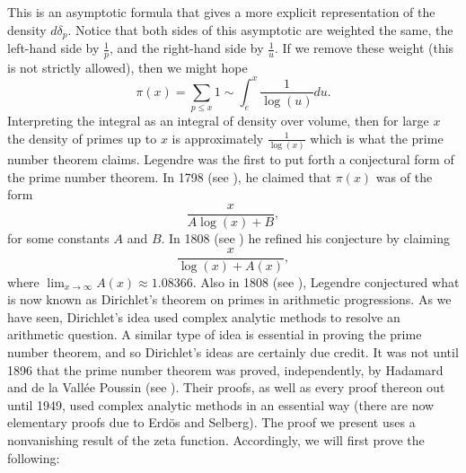 \documentclass[12pt]{book}
\theoremstyle{definition}\newframedtheorem{method}{Method}
\renewcommand{\d}{\delta}
\newcommand{\<}{\langle}
\renewcommand{\>}{\rangle}
\begin{document}
      This is an asymptotic formula that gives a more explicit representation of the density $d\d_{p}$. Notice that both sides of this asymptotic are weighted the same, the left-hand side by $\frac{1}{p}$, and the right-hand side by $\frac{1}{u}$. If we remove these weight (this is not strictly allowed), then we might hope
      \[
        \pi(x) = \sum_{p \le x}1 \sim \int_{e}^{x}\frac{1}{\log(u)}du.
      \]
      Interpreting the integral as an integral of density over volume, then for large $x$ the density of primes up to $x$ is approximately $\frac{1}{\log(x)}$ which is what the prime number theorem claims. Legendre was the first to put forth a conjectural form of the prime number theorem. In 1798 (see \cite{legendreessai}), he claimed that $\pi(x)$ was of the form
      \[
        \frac{x}{A\log(x)+B},
      \]
      for some constants $A$ and $B$. In 1808 (see \cite{legendre1808essai}) he refined his conjecture by claiming
      \[
        \frac{x}{\log(x)+A(x)},
      \]
      where $\lim_{x \to \infty}A(x) \approx 1.08366$. Also in 1808 (see \cite{legendre1808essai}), Legendre conjectured what is now known as Dirichlet's theorem on primes in arithmetic progressions. As we have seen, Dirichlet's idea used complex analytic methods to resolve an arithmetic question. A similar type of idea is essential in proving the prime number theorem, and so Dirichlet's ideas are certainly due credit. It was not until 1896 that the prime number theorem was proved, independently, by Hadamard and de la Vall\'ee Poussin (see \cite{hadamard1896distribution,poussin1897recherches}). Their proofs, as well as every proof thereon out until 1949, used complex analytic methods in an essential way (there are now elementary proofs due to Erd\"os and Selberg). The proof we present uses a nonvanishing result of the zeta function. Accordingly, we will first prove the following:
\end{document}
